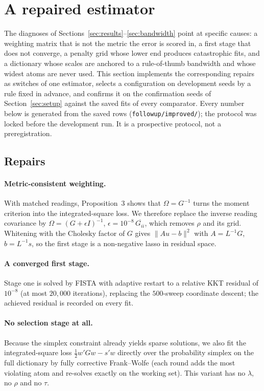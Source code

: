 \section{A repaired estimator}
\label{sec:repaired}

The diagnoses of Sections~\ref{sec:results}--\ref{sec:bandwidth} point at
specific causes: a weighting matrix that is not the metric the error is
scored in, a first stage that does not converge, a penalty grid whose lower
end produces catastrophic fits, and a dictionary whose scales are anchored to
a rule-of-thumb bandwidth and whose widest atoms are never used. This section
implements the corresponding repairs as switches of one estimator, selects a
configuration on development seeds by a rule fixed in advance, and confirms
it on the confirmation seeds of Section~\ref{sec:setup} against the saved
fits of every comparator. Every number below is generated from the saved
rows (\texttt{followup/improved/}); the protocol was locked before the
development run. It is a prospective protocol, not a preregistration.

\subsection{Repairs}

\paragraph{Metric-consistent weighting.} With matched readings, Proposition~3
shows that $\Omega = G^{-1}$ turns the moment criterion into the
integrated-square loss. We therefore replace the inverse reading covariance
by $\Omega = (G + \epsilon I)^{-1}$, $\epsilon = 10^{-8}\,\overline{G_{ii}}$,
which removes $\rho$ and its grid. Whitening with the Cholesky factor of
$G$ gives $\|Au - b\|^2$ with $A = L^{-1}G$, $b = L^{-1}s$, so the first
stage is a non-negative lasso in residual space.

\paragraph{A converged first stage.} Stage one is solved by FISTA with
adaptive restart to a relative KKT residual of $10^{-8}$ (at most $20{,}000$
iterations), replacing the $500$-sweep coordinate descent; the achieved
residual is recorded on every fit.

\paragraph{No selection stage at all.} Because the simplex constraint already
yields sparse solutions, we also fit the integrated-square loss
$\tfrac12 w'Gw - s'w$ directly over the probability simplex on the full
dictionary by fully corrective Frank--Wolfe (each round adds the most
violating atom and re-solves exactly on the working set). This variant has
no $\lambda$, no $\rho$ and no $\tau$.

